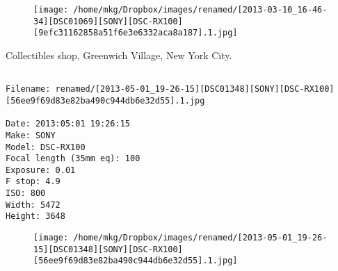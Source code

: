 \begin{figure}
\texttt{[image: /home/mkg/Dropbox/images/renamed/[2013-03-10\_16-46-34][DSC01069][SONY][DSC-RX100][9efc31162858a51f6e3e6332aca8a187].1.jpg]}
\end{figure}
    
\clearpage
\onecolumn
\noindent Collectibles shop, Greenwich Village, New York City.
\noindent
\begin{lstlisting}

Filename: renamed/[2013-05-01_19-26-15][DSC01348][SONY][DSC-RX100][56ee9f69d83e82ba490c944db6e32d55].1.jpg

Date: 2013:05:01 19:26:15
Make: SONY
Model: DSC-RX100
Focal length (35mm eq): 100
Exposure: 0.01
F stop: 4.9
ISO: 800
Width: 5472
Height: 3648
\end{lstlisting}
\clearpage

\begin{figure}
\texttt{[image: /home/mkg/Dropbox/images/renamed/[2013-05-01\_19-26-15][DSC01348][SONY][DSC-RX100][56ee9f69d83e82ba490c944db6e32d55].1.jpg]}
\end{figure}
    
